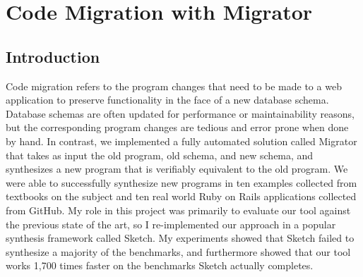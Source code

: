 \documentclass[]{article}
\begin{document}






    \section{Code Migration with Migrator}

        \subsection{Introduction}

            Code migration refers to the program changes that need to be made to a web application to preserve functionality in the face of a new database schema. Database schemas are often updated for performance or maintainability reasons, but the corresponding program changes are tedious and error prone when done by hand. In contrast, we implemented a fully automated solution called Migrator that takes as input the old program, old schema, and new schema, and synthesizes a new program that is verifiably equivalent to the old program. We were able to successfully synthesize new programs in ten examples collected from textbooks on the subject and ten real world Ruby on Rails applications collected from GitHub. My role in this project was primarily to evaluate our tool against the previous state of the art, so I re-implemented our approach in a popular synthesis framework called Sketch. My experiments showed that Sketch failed to synthesize a majority of the benchmarks, and furthermore showed that our tool works 1,700 times faster on the benchmarks Sketch actually completes.
\end{document}
